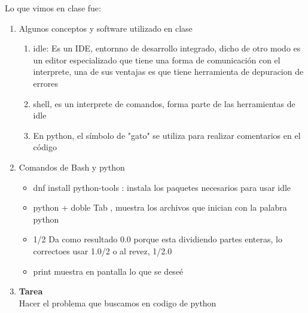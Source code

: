 \documentclass[letterpaper, 12pt, oneside]{article}%
\begin{document}
Lo que vimos en clase fue:%
\begin{enumerate}%
	\item Algunos conceptos y software utilizado en clase%
		\begin{enumerate}
			\item idle: Es un IDE, entornno de desarrollo integrado, dicho de otro modo es un editor especializado que tiene una forma de comunicación con el interprete, una de sus ventajas es que tiene herramienta de depuracion de errores
			\item shell, es un interprete de comandos, forma parte de las herramientas de idle
			\item En python, el símbolo de "gato" se utiliza para realizar comentarios en el código
		\end{enumerate}
	
	\item Comandos de Bash y python %
	\begin{itemize}%
		\item dnf install python-tools : instala los paquetes necesarios para usar idle
		\item python + doble Tab , muestra los archivos que inician con la palabra python
		\item 1/2 Da como resultado 0.0 porque esta dividiendo partes enteras, lo correctoes usar 1.0/2 o al revez, 1/2.0
		\item print muestra en pantalla lo que se deseé
		
				
	\end{itemize}%
	
	\item \textbf{Tarea}
	\\
	Hacer el problema que buscamos en codigo de python
		
	
\end{enumerate}%
	
\end{document}
